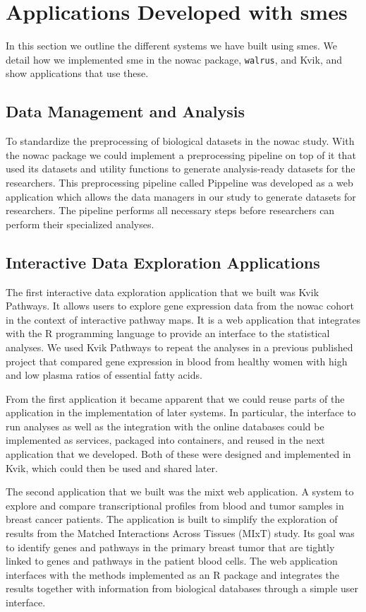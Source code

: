 \section{Applications Developed with \glspl{sme}}
In this section we outline the different systems we have built using
\glspl{sme}. We detail how we implemented \gls{sme} in the \gls{nowac} package,
\texttt{walrus}, and Kvik, and show applications that use these. 

\subsection{Data Management and Analysis} 
To standardize the preprocessing of biological datasets in the
\gls{nowac} study. With the \gls{nowac} package we could implement a
preprocessing pipeline on top of it that used its datasets and utility functions
to generate analysis-ready datasets for the researchers.  This preprocessing
pipeline called Pippeline was developed as a web application which allows the
data managers in our study to generate datasets for researchers.
The pipeline performs all necessary steps before researchers can perform their
specialized analyses. 

\subsection{Interactive Data Exploration Applications}
The first interactive data exploration application that we built was Kvik
Pathways.  It allows users to explore gene expression data from the \gls{nowac}
cohort in the context of interactive pathway maps.\cite{fjukstad2015kvik} It is
a web application that integrates with the R programming language to provide an
interface to the statistical analyses. We used Kvik Pathways to repeat the
analyses in a previous published project that compared gene expression in blood
from healthy women with high and low plasma ratios of essential fatty
acids.\cite{olsen2013plasma}

From the first application it became apparent that we could reuse parts of the
application in the implementation of later systems. In particular, the interface
to run analyses as well as the integration with the online databases could be
implemented as services, packaged into containers, and reused in the next
application that we developed. Both of these were designed and implemented in
Kvik, which could then be used and shared later. 

The second application that we built was the \gls{mixt} web application. A
system to explore and compare transcriptional profiles from blood and tumor
samples in breast cancer patients. The application is built to simplify the
exploration of results from the Matched Interactions Across Tissues (MIxT)
study. Its goal was to identify genes and pathways in the primary breast tumor
that are tightly linked to genes and pathways in the patient blood
cells.\cite{dumeaux2017interactions} The web application interfaces with the
methods implemented as an R package and integrates the results together with
information from biological databases through a simple user interface. 

